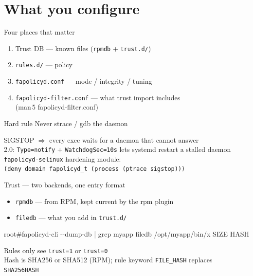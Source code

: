 \documentclass[aspectratio=169,11pt]{beamer}
\newcommand{\ok}[1]{\textcolor{allowc}{#1}}
\newcommand{\no}[1]{\textcolor{denyc}{#1}}
\newcommand{\rootp}{\textcolor{rootc}{root\#}}
\newcommand{\dd}{-{}-}
\begin{document}
\section{What you configure}

\begin{frame}{Four places that matter}
  \begin{enumerate}
    \item Trust DB --- known files (\texttt{rpmdb} + \texttt{trust.d/})
    \item \texttt{rules.d/} --- policy
    \item \texttt{fapolicyd.conf} --- mode / integrity / tuning
    \item \texttt{fapolicyd-filter.conf} --- what trust import includes\\
          {\small (man\,5 fapolicyd-filter.conf)}
  \end{enumerate}
\end{frame}

\begin{frame}{Hard rule}
  \centering
  \vspace{0.8em}
  {\Large Never strace / gdb the daemon}
  \vspace{0.8em}

  SIGSTOP $\Rightarrow$ every exec waits for a daemon that cannot answer\\[0.8em]
  {\small 2.0: \texttt{Type=notify} + \texttt{WatchdogSec=10s} lets systemd
  restart a stalled daemon\\[0.4em]
  \texttt{fapolicyd-selinux} hardening module:\\
  \texttt{(deny domain fapolicyd\_t (process (ptrace sigstop)))}}
\end{frame}

\begin{frame}[fragile]{Trust --- two backends, one entry format}
  \begin{itemize}
    \item \texttt{rpmdb} --- from RPM, kept current by the rpm plugin
    \item \texttt{filedb} --- what you add in \texttt{trust.d/}
  \end{itemize}
  \begin{semiverbatim}
\rootp fapolicyd-cli \dd{}dump-db | grep myapp
filedb /opt/myapp/bin/x  SIZE  HASH
  \end{semiverbatim}
  Rules only see \ok{\texttt{trust=1}} or \no{\texttt{trust=0}}\\
  {\small Hash is SHA256 or SHA512 (RPM); rule keyword \texttt{FILE\_HASH}
  replaces \texttt{SHA256HASH}}
\end{frame}
\end{document}

